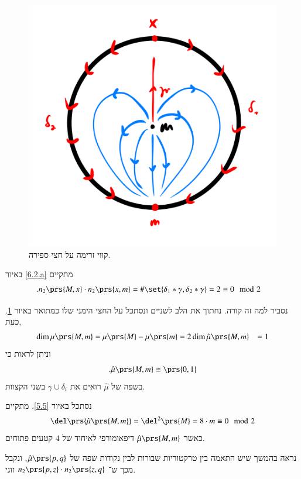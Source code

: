 \documentclass[a4paper,10pt,twoside,openany]{book}
\begin{document}
\begin{figure}
\centering
\includegraphics[scale=0.5]{sources/6.2.b}
\caption{קווי זרימה על חצי ספירה.}
\label{6.2.b}
\end{figure}

\begin{example}
באיור
\ref{6.2.a}
מתקיים
\begin{align*}
\text{.} n_2\prs{M,x} \cdot n_2\prs{x,m} &= \#\set{\delta_1 * \gamma, \delta_2 * \gamma} = 2 \equiv 0 \mod{2}
\end{align*}

נסביר למה זה קורה. נחתוך את הלב לשניים ונסתכל על החצי הימני שלו כמתואר באיור
\ref{6.2.b}.
כעת,
\begin{align*}
\dim \mu\prs{M,m} &= \mu\prs{M} - \mu\prs{m} = 2
\dim \hat{\mu}\prs{M,m} &= 1
\end{align*}
וניתן לראות כי
\[\text{.} \hat{\mu}\prs{M,m} \cong \prs{0,1}\]
בשפה של
$\hat{\mu}$
רואים את
$\gamma \cup \delta_i$
בשני הקצוות.
\end{example}

\begin{example}
נסתכל באיור
\ref{5.5}.
מתקיים
\[\del\prs{\hat{\mu}\prs{M,m}} = \del^2\prs{M} = 8 \cdot m \equiv 0 \mod{2}\]
כאשר
$\hat{\mu}\prs{M,m}$
דיפאומורפי לאיחוד של
$4$
קטעים פתוחים.

נראה בהמשך שיש התאמה בין טרקטוריות שבורות לבין נקודות שפה של
$\hat{\mu}\prs{p,q}$,
ונקבל מכך ש־%
$n_2\prs{p,z} \cdot n_2\prs{z,q}$
זוגי.
\end{example}
\end{document}
